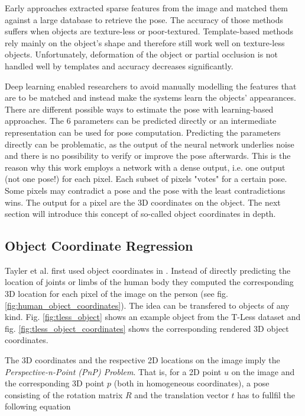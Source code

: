 Early approaches extracted sparse features from the image and matched them against a large database to retrieve the pose. The accuracy of those methods suffers when objects are texture-less or poor-textured. Template-based methods rely mainly on the object's shape and therefore still work well on texture-less objects. Unfortunately, deformation of the object or partial occlusion is not handled well by templates and accuracy decreases significantly.

Deep learning enabled researchers to avoid manually modelling the features that are to be matched and instead make the systems learn the objects' appearances. There are different possible ways to estimate the pose with learning-based approaches. The 6 parameters can be predicted directly or an intermediate representation can be used for pose computation. Predicting the parameters directly can be problematic, as the output of the neural network underlies noise and there is no possibility to verify or improve the pose afterwards. This is the reason why this work employs a network with a dense output, i.e. one output (not one pose!) for each pixel. Each subset of pixels "votes" for a certain pose. Some pixels may contradict a pose and the pose with the least contradictions wins. The output for a pixel are the 3D coordinates on the object. The next section will introduce this concept of so-called object coordinates in depth.

\subsection{Object Coordinate Regression} \label{objectcoordinates}

Tayler et al. first used object coordinates in \cite{tsharp}. Instead of directly predicting the location of joints or limbs of the human body they computed the corresponding 3D location for each pixel of the image on the person (see fig. \ref{fig:human_object_coordinates}). The idea can be transfered to objects of any kind. Fig. \ref{fig:tless_object} shows an example object from the T-Less dataset \cite{tless} and fig. \ref{fig:tless_object_coordinates} shows the corresponding rendered 3D object coordinates.

The 3D coordinates and the respective 2D locations on the image imply the \textit{Perspective-n-Point (PnP) Problem}. That is, for a 2D point $u$ on the image and the corresponding 3D point $p$ (both in homogeneous coordinates), a pose consisting of the rotation matrix $R$ and the translation vector $t$ has to fullfil the following equation

